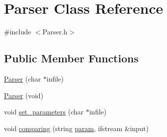 \hypertarget{classParser}{
\section{Parser Class Reference}
\label{classParser}
}


{\ttfamily \#include $<$Parser.h$>$}

\subsection*{Public Member Functions}
\begin{DoxyCompactItemize}
\item 
\hyperlink{classParser_abc75c0a7b785e032e4b9de51ee771f66}{Parser} (char $\ast$infile)
\item 
\hyperlink{classParser_a5dfbeb40b0d8dbb76ac2212a41ff6248}{Parser} (void)
\item 
void \hyperlink{classParser_ac3854cf49b4abdcf3a130477c3c7dbf7}{set\_\-parameters} (char $\ast$infile)
\item 
void \hyperlink{classParser_a749bb0b98af67a59540977c7271405e0}{comparing} (string \hyperlink{classParser_a52d2639511cc6ae75cb7e26b3a632169}{param}, ifstream \&input)
\end{DoxyCompactItemize}
